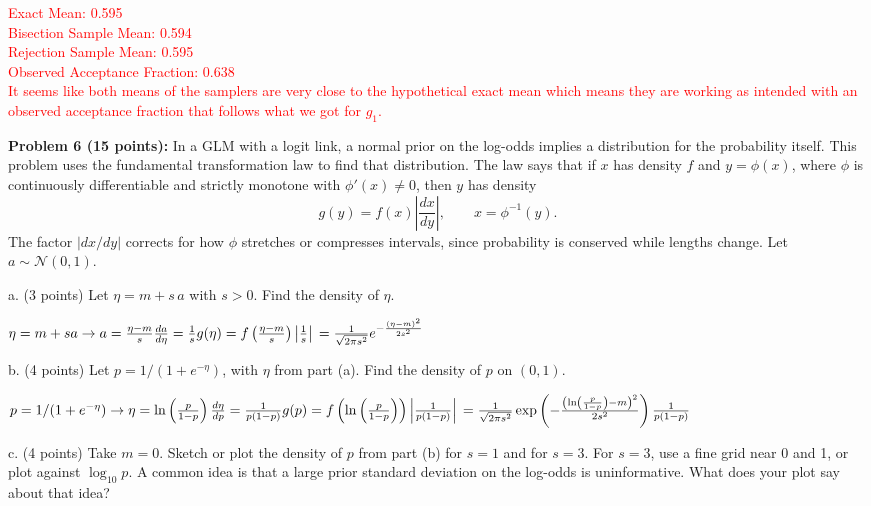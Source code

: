 \documentclass[11pt]{article}
\begin{document}
\textcolor{red}{
Exact Mean: 0.595\\
Bisection Sample Mean: 0.594\\
Rejection Sample Mean: 0.595\\
Observed Acceptance Fraction: 0.638\\
It seems like both means of the samplers are very close to the hypothetical exact mean which means they are working as intended with an observed acceptance fraction that follows what we got for $g_1$.
}

{\bf *Problem 6 (15 points):} In a GLM with a logit link, a normal prior on the log-odds implies a distribution for the probability itself.  This problem uses the fundamental transformation law to find that distribution. The law says that if $x$ has density $f$ and $y=\phi(x)$, where $\phi$ is continuously differentiable and strictly monotone with $\phi'(x)\ne0$, then $y$ has density
\[
g(y)=f(x)\left|\frac{dx}{dy}\right|,\qquad x=\phi^{-1}(y).
\]
The factor $|dx/dy|$ corrects for how $\phi$ stretches or compresses intervals, since probability is conserved while lengths change.  Let $a\sim\mathcal N(0,1)$.

a. (3 points) Let $\eta=m+s\,a$ with $s>0$.  Find the density of $\eta$.

\textcolor{red}{
$\eta = m+sa \rightarrow a = \frac{\eta - m}{s}\\
\frac{da}{d\eta} = \frac{1}{s}\\
g(\eta) = f\left(\frac{\eta - m}{s}\right) \left\vert{} \frac{1}{s} \right\vert{} = \frac{1}{\sqrt{2\pi s^2}} e^{-\frac{(\eta - m)^2}{2s^2}}$
}

b. (4 points) Let $p=1/(1+e^{-\eta})$, with $\eta$ from part (a).  Find the density of $p$ on $(0,1)$.

\textcolor{red}{
$p = 1 / (1 + e^{-\eta}) \rightarrow \eta = \ln\left(\frac{p}{1-p}\right)\\
\frac{d\eta}{dp} = \frac{1}{p(1-p)}\\
g(p) = f\left(\ln\left(\frac{p}{1-p}\right)\right) \left\vert{} \frac{1}{p(1-p)} \right\vert{} = \frac{1}{\sqrt{2\pi s^2}} \exp\left(-\frac{\left(\ln\left(\frac{p}{1-p}\right) - m\right)^2}{2s^2}\right) \frac{1}{p(1-p)}$
}

c. (4 points) Take $m=0$.  Sketch or plot the density of $p$ from part (b) for $s=1$ and for $s=3$.  For $s=3$, use a fine grid near 0 and 1, or plot against $\log_{10}p$.  A common idea is that a large prior standard deviation on the log-odds is uninformative.  What does your plot say about that idea?
\end{document}
